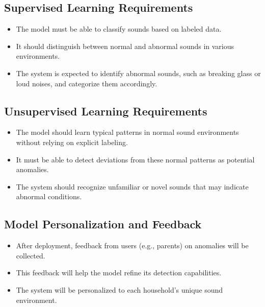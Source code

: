 \documentclass[conference]{IEEEtran}
\begin{document}
\subsection{Supervised Learning Requirements}
\begin{itemize}
    \item The model must be able to classify sounds based on labeled data.
    \item It should distinguish between normal and abnormal sounds in various environments.
    \item The system is expected to identify abnormal sounds, such as breaking glass or loud noises, and categorize them accordingly.
\end{itemize}

\subsection{Unsupervised Learning Requirements}
\begin{itemize}
    \item The model should learn typical patterns in normal sound environments without relying on explicit labeling.
    \item It must be able to detect deviations from these normal patterns as potential anomalies.
    \item The system should recognize unfamiliar or novel sounds that may indicate abnormal conditions.
\end{itemize}

\subsection{Model Personalization and Feedback}
\begin{itemize}
    \item After deployment, feedback from users (e.g., parents) on anomalies will be collected.
    \item This feedback will help the model refine its detection capabilities.
    \item The system will be personalized to each household's unique sound environment.
\end{itemize}
\end{document}
